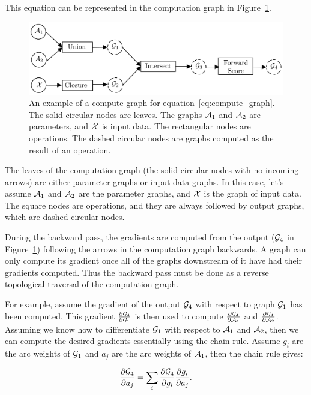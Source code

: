 This equation can be represented in the computation graph in
Figure~\ref{fig:compute_graph}.

\begin{figure}
    \centering
    \includegraphics[scale=0.9]{figures/compute_graph}
    \caption{An example of a compute graph for equation~\ref{eq:compute_graph}.
    The solid circular nodes are leaves. The graphs $\mathcal{A}_1$ and $\mathcal{A}_2$ are
    parameters, and $\mathcal{X}$ is input data. The rectangular nodes are operations.
    The dashed circular nodes are graphs computed as the result of an
    operation.}
    \label{fig:compute_graph}
\end{figure}

The leaves of the computation graph (the solid circular nodes with no incoming
arrows) are either parameter graphs or input data graphs. In this case, let's
assume $\mathcal{A}_1$ and $\mathcal{A}_2$ are the parameter graphs, and $\mathcal{X}$ is the graph of
input data. The square nodes are operations, and they are always followed by
output graphs, which are dashed circular nodes.

During the backward pass, the gradients are computed from the output ($\mathcal{G}_4$
in Figure~\ref{fig:compute_graph}) following the arrows in the computation
graph backwards. A graph can only compute its gradient once all of the graphs
downstream of it have had their gradients computed. Thus the backward pass must
be done as a reverse topological traversal of the computation graph.

For example, assume the gradient of the output $\mathcal{G}_4$ with respect to graph
$\mathcal{G}_1$ has been computed. This gradient $\frac{\partial \mathcal{G}_4}{\partial
\mathcal{G}_1}$ is then used to compute $\frac{\partial \mathcal{G}_4}{\partial \mathcal{A}_1}$ and
$\frac{\partial \mathcal{G}_4}{\partial \mathcal{A}_2}$. Assuming we know how to differentiate
$\mathcal{G}_1$ with respect to $\mathcal{A}_1$ and $\mathcal{A}_2$, then we can compute the desired
gradients essentially using the chain rule. Assume $g_i$ are the arc weights of
$\mathcal{G}_1$ and $a_j$ are the arc weights of $\mathcal{A}_1$, then the chain rule gives:

$$
\frac{\partial \mathcal{G}_4}{\partial a_j} =
    \sum_{i} \frac{\partial \mathcal{G}_4}{\partial g_i} \frac{\partial g_i}{\partial a_j}.
$$

